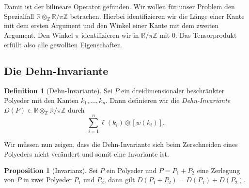 \documentclass[11pt,titlepage]{article}
\newcommand{\setZ}{\mathbb{Z}}
\newcommand{\setR}{\mathbb{R}}
\theoremstyle{definition}
\newtheorem{proposition}[theorem]{Proposition}
\newtheorem{definition}[theorem]{Definition}
\theoremstyle{remark}
\begin{document}
	Damit ist der bilineare Operator gefunden. Wir wollen für unser Problem den Spezialfall 
	$\setR \otimes_{\setZ} \setR / \pi\setZ$ betrachen. Hierbei identifizieren wir die Länge einer Kante mit dem 
	ersten Argument und den Winkel einer Kante mit dem zweiten Argument. 
	Den Winkel $\pi$ identifizieren wir in $\setR/\pi\setZ$ mit $0$. Das 
	Tensorprodukt erfüllt also alle gewollten Eigenschaften. 
	
	\subsection{Die Dehn-Invariante}
	
	\begin{definition}[Dehn-Invariante]
		Sei $P$ ein dreidimensionaler beschränkter Polyeder mit den Kanten $k_1,\ldots,k_n$. Dann definieren wir die 
		\textsl{Dehn-Invariante} $D(P)\in \setR \otimes_{\setZ}\setR/\pi \setZ$ durch
		\[ \sum_{i=1}^n \ell(k_i)\otimes [w(k_i)]. \]
	\end{definition}
	
	Wir müssen nun zeigen, dass die Dehn-Invariante sich beim Zerschneiden eines Polyeders nicht 
	verändert und somit eine Invariante ist.
	
	\begin{proposition}[Invarianz] \label{prop:invarianz}
		Sei $P$ ein Polyeder und $P=P_1+P_2$ eine Zerlegung von $P$ in zwei Polyeder $P_1$ und $P_2$, dann 
		gilt $D(P_1+P_2)=D(P_1)+D(P_2)$.	
	\end{proposition}
	
\end{document}
